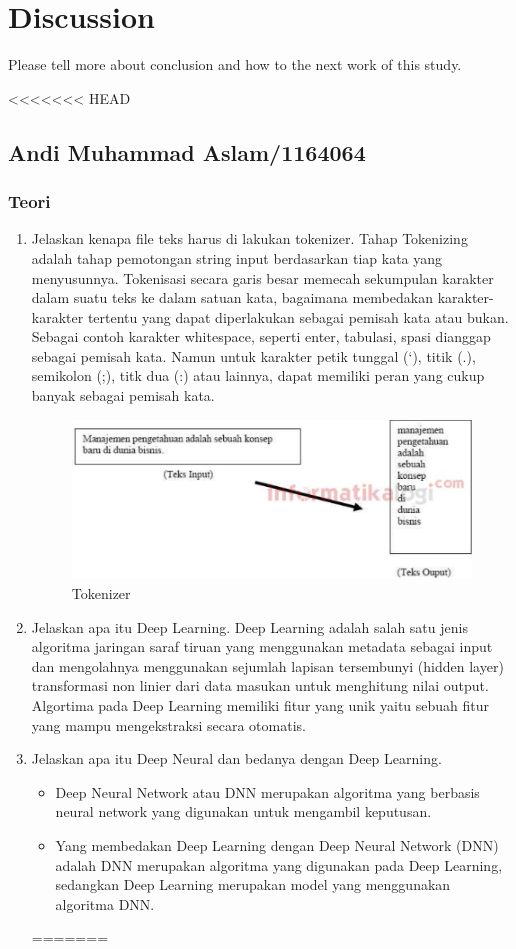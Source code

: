 \chapter{Discussion}
Please tell more about conclusion and how to the next work of this study.

<<<<<<< HEAD
\section{Andi Muhammad Aslam/1164064}
\subsection{Teori}
\begin{enumerate}
\item Jelaskan kenapa file teks harus di lakukan tokenizer.
\subitem Tahap Tokenizing adalah tahap pemotongan string input berdasarkan tiap kata yang menyusunnya. Tokenisasi secara garis besar memecah sekumpulan karakter dalam suatu teks ke dalam satuan kata, bagaimana membedakan karakter-karakter tertentu yang dapat diperlakukan sebagai pemisah kata atau bukan. Sebagai contoh karakter whitespace, seperti enter, tabulasi, spasi dianggap sebagai pemisah kata. Namun untuk karakter petik tunggal (‘), titik (.), semikolon (;), titk dua (:) atau lainnya, dapat memiliki peran yang cukup banyak sebagai pemisah kata.
\begin{figure}[!htbp]
	\centerline{\includegraphics[width=1\textwidth]{figures/andi/7-1.PNG}}
	\caption{Tokenizer}
	\label{c7_1}
\end{figure}

\item Jelaskan apa itu Deep Learning.
\subitem Deep Learning adalah salah satu jenis algoritma jaringan saraf tiruan yang menggunakan metadata sebagai input dan mengolahnya menggunakan sejumlah lapisan tersembunyi (hidden layer) transformasi non linier dari data masukan untuk menghitung nilai output. Algortima pada Deep Learning memiliki fitur yang unik yaitu sebuah fitur yang mampu mengekstraksi secara otomatis.
\item Jelaskan apa itu Deep Neural dan bedanya dengan Deep Learning.
\begin{itemize}
\item Deep Neural Network atau DNN merupakan algoritma yang berbasis neural network yang digunakan untuk mengambil keputusan.
\item Yang membedakan Deep Learning dengan  Deep Neural Network (DNN) adalah DNN merupakan algoritma yang digunakan pada Deep Learning, sedangkan Deep Learning merupakan model yang menggunakan algoritma DNN.
\end{itemize}
=======

\end{enumerate}
